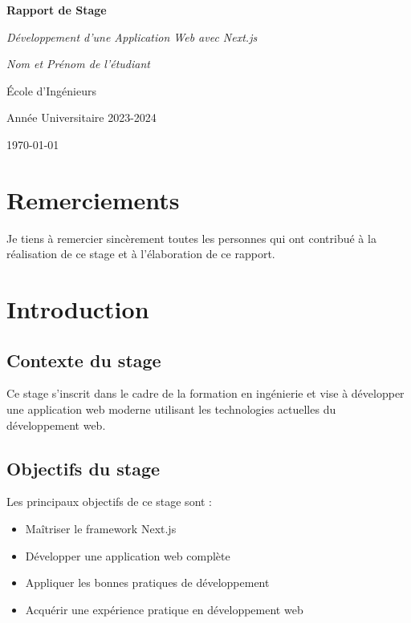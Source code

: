 \documentclass[12pt,a4paper]{report}
\begin{document}
\begin{titlepage}
    \centering
    \vspace*{2cm}
    {\Huge\bfseries Rapport de Stage\par}
    \vspace{1.5cm}
    {\Large\itshape Développement d'une Application Web avec Next.js\par}
    \vspace{2cm}
    {\Large\itshape Nom et Prénom de l'étudiant\par}
    \vspace{1cm}
    {\large École d'Ingénieurs\par}
    \vspace{1cm}
    {\large Année Universitaire 2023-2024\par}
    \vfill
    {\large \today\par}
\end{titlepage}

\tableofcontents
\newpage

\chapter*{Remerciements}
Je tiens à remercier sincèrement toutes les personnes qui ont contribué à la réalisation de ce stage et à l'élaboration de ce rapport.

\chapter{Introduction}
\section{Contexte du stage}
Ce stage s'inscrit dans le cadre de la formation en ingénierie et vise à développer une application web moderne utilisant les technologies actuelles du développement web.

\section{Objectifs du stage}
Les principaux objectifs de ce stage sont :
\begin{itemize}
    \item Maîtriser le framework Next.js
    \item Développer une application web complète
    \item Appliquer les bonnes pratiques de développement
    \item Acquérir une expérience pratique en développement web
\end{itemize}
\end{document}
